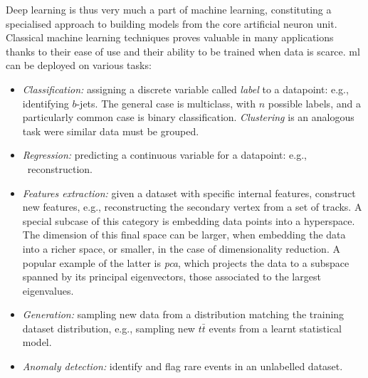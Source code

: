 Deep learning is thus very much a part of machine learning, constituting a specialised approach to building models from the core artificial neuron unit. Classical machine learning techniques proves valuable in many applications thanks to their ease of use and their ability to be trained when data is scarce. \gls{ml} can be deployed on various tasks: 
\begin{itemize}
    \item \textit{Classification:} assigning a discrete variable called \textit{label} to a datapoint: e.g., identifying $b$-jets. The general case is multiclass, with $n$ possible labels, and a particularly common case is binary classification. \textit{Clustering} is an analogous task were similar data must be grouped.
    \item \textit{Regression:} predicting a continuous variable for a datapoint: e.g., \pt\ reconstruction. 
    \item \textit{Features extraction:} given a dataset with specific internal features, construct new features, e.g., reconstructing the secondary vertex from a set of tracks. A special subcase of this category is embedding data points into a hyperspace. The dimension of this final space can be larger, when embedding the data into a richer space, or smaller, in the case of dimensionality reduction. A popular example of the latter is \textit{\gls{pca}}, which projects the data to a subspace spanned by its principal eigenvectors, those associated to the largest eigenvalues.
    \item \textit{Generation:} sampling new data from a distribution matching the training dataset distribution, e.g., sampling new $t\bar{t}$ events from a learnt statistical model. 
    \item \textit{Anomaly detection:} identify and flag rare events in an unlabelled dataset.
\end{itemize}

